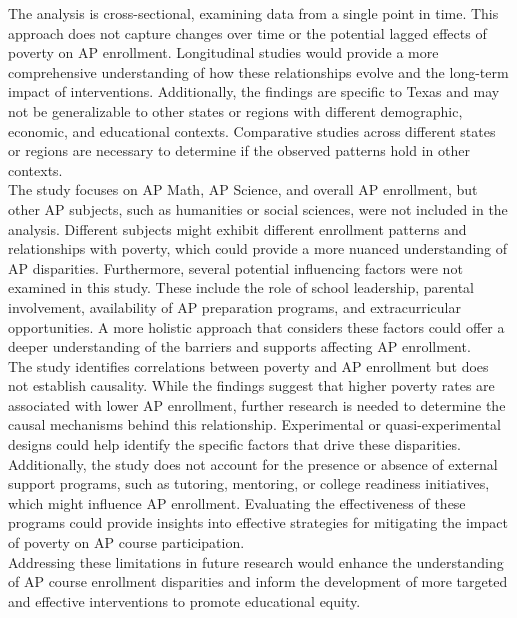 \documentclass[sn-mathphys-num]{sn-jnl}%
\theoremstyle{thmstyleone}%
\theoremstyle{thmstyletwo}%
\theoremstyle{thmstylethree}%
\begin{document}
{The analysis is cross-sectional, examining data from a single point in time. This approach does not capture changes over time or the potential lagged effects of poverty on AP enrollment. Longitudinal studies would provide a more comprehensive understanding of how these relationships evolve and the long-term impact of interventions. Additionally, the findings are specific to Texas and may not be generalizable to other states or regions with different demographic, economic, and educational contexts. Comparative studies across different states or regions are necessary to determine if the observed patterns hold in other contexts.\\

The study focuses on AP Math, AP Science, and overall AP enrollment, but other AP subjects, such as humanities or social sciences, were not included in the analysis. Different subjects might exhibit different enrollment patterns and relationships with poverty, which could provide a more nuanced understanding of AP disparities. Furthermore, several potential influencing factors were not examined in this study. These include the role of school leadership, parental involvement, availability of AP preparation programs, and extracurricular opportunities. A more holistic approach that considers these factors could offer a deeper understanding of the barriers and supports affecting AP enrollment.\\

The study identifies correlations between poverty and AP enrollment but does not establish causality. While the findings suggest that higher poverty rates are associated with lower AP enrollment, further research is needed to determine the causal mechanisms behind this relationship. Experimental or quasi-experimental designs could help identify the specific factors that drive these disparities. Additionally, the study does not account for the presence or absence of external support programs, such as tutoring, mentoring, or college readiness initiatives, which might influence AP enrollment. Evaluating the effectiveness of these programs could provide insights into effective strategies for mitigating the impact of poverty on AP course participation.\\

Addressing these limitations in future research would enhance the understanding of AP course enrollment disparities and inform the development of more targeted and effective interventions to promote educational equity.\\

}
\end{document}
